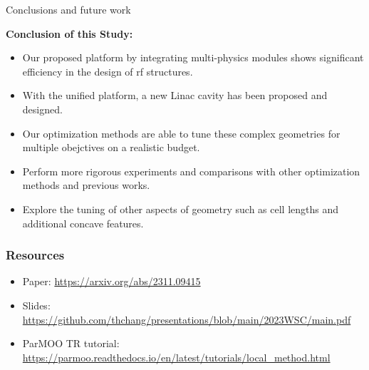 \documentclass[aspectratio=169]{beamer}
\begin{document}
\begin{frame}{Conclusions and future work}

{\bf Conclusion of this Study:}

\begin{itemize}
    \item Our proposed platform by integrating multi-physics modules shows significant efficiency in the design of rf structures.
    \item With the unified platform, a new Linac cavity has been proposed and designed.
    \item Our optimization methods are able to tune these complex geometries for multiple obejctives on a realistic budget.
\end{itemize}


\bigskip
{}

\begin{itemize}
    \item Perform more rigorous experiments and comparisons with other optimization methods and previous works.
    \item Explore the tuning of other aspects of geometry such as cell lengths and additional concave features.
\end{itemize}
\end{frame}

\begin{frame}\frametitle{Resources}

\large

\begin{itemize}
\item Paper:  \url{https://arxiv.org/abs/2311.09415}
\item Slides:  \url{https://github.com/thchang/presentations/blob/main/2023WSC/main.pdf}
\item ParMOO TR tutorial:  \url{https://parmoo.readthedocs.io/en/latest/tutorials/local_method.html}
\end{itemize}

\end{frame}
\end{document}
